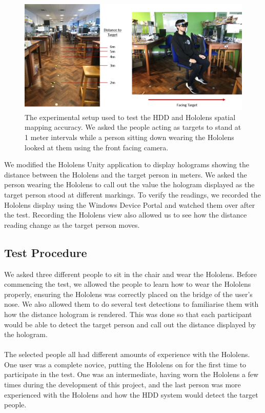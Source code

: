 \begin{figure}[ht]
    \centering
    \includegraphics[width=1.0\linewidth]{img/chapter6_test/hddTestSetup.png}
    \caption{The experimental setup used to test the HDD and Hololens spatial mapping accuracy. We asked the people acting as targets to stand at 1 meter intervals while a person sitting down wearing the Hololens looked at them using the front facing camera.}
    \label{fig:hddTestSetup}
\end{figure}
 
We modified the Hololens Unity application to display holograms showing the distance between the Hololens and the target person in meters. We asked the person wearing the Hololens to call out the value the hologram displayed as the target person stood at different markings. To verify the readings, we recorded the Hololens display using the Windows Device Portal and watched them over after the test. Recording the Hololens view also allowed us to see how the distance reading change as the target person moves.
 
\subsection{Test Procedure}
We asked three different people to sit in the chair and wear the Hololens. Before commencing the test, we allowed the people to learn how to wear the Hololens properly, ensuring the Hololens was correctly placed on the bridge of the user's nose. We also allowed them to do several test detections to familiarise them with how the distance hologram is rendered. This was done so that each participant would be able to detect the target person and call out the distance displayed by the hologram.

\paragraph{} The selected people all had different amounts of experience with the Hololens. One user was a complete novice, putting the Hololens on for the first time to participate in the test. One was an intermediate, having worn the Hololens a few times during the development of this project, and the last person was more experienced with the Hololens and how the HDD system would detect the target people.

